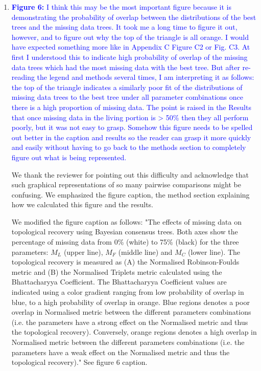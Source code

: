 \documentclass[12pt,letterpaper]{article}
\begin{document}
\begin{enumerate}
\item{\textcolor{blue}{\textbf{Figure 6:} I think this may be the most important figure because it is demonstrating the probability of overlap between the distributions of the best trees and the missing data trees.
It took me a long time to figure it out, however, and to figure out why the top of the triangle is all orange.
I would have expected something more like in Appendix C Figure C2 or Fig. C3.
At first I understood this to indicate high probability of overlap of the missing data trees which had the most missing data with the best tree.
But after re-reading the legend and methods several times, I am interpreting it as follows: the top of the triangle indicates a similarly poor fit of the distributions of missing data trees to the best tree under all parameter combinations once there is a high proportion of missing data.
The point is raised in the Results that once missing data in the living portion is > 50\% then they all perform poorly, but it was not easy to grasp.
Somehow this figure needs to be spelled out better in the caption and results so the reader can grasp it more quickly and easily without having to go back to the methods section to completely figure out what is being represented.}}

We thank the reviewer for pointing out this difficulty and acknowledge that such graphical representations of so many pairwise comparisons might be confusing.
We emphasized the figure caption, the method section explaining how we calculated this figure and the results.

We modified the figure caption as follows:
"The effects of missing data on topological recovery using Bayesian consensus trees. Both axes show the percentage of missing data from 0\% (white) to 75\% (black) for the three parameters: $M_{L}$ (upper line), $M_{F}$ (middle line) and $M_{C}$ (lower line). The topological recovery is measured as (A) the Normalised Robinson-Foulds metric and (B) the Normalised Triplets metric calculated using the Bhattacharyya Coefficient. The Bhattacharyya Coefficient values are indicated using a color gradient ranging from low probability of overlap in blue, to a high probability of overlap in orange. Blue regions denotes a poor overlap in Normalised metric between the different parameters combinations (i.e. the parameters have a strong effect on the Normalised metric and thus the topological recovery). Conversely, orange regions denotes a high overlap in Normalised metric between the different parameters combinations (i.e. the parameters have a weak effect on the Normalised metric and thus the topological recovery)." See figure 6 caption.


\end{enumerate}
\end{document}
